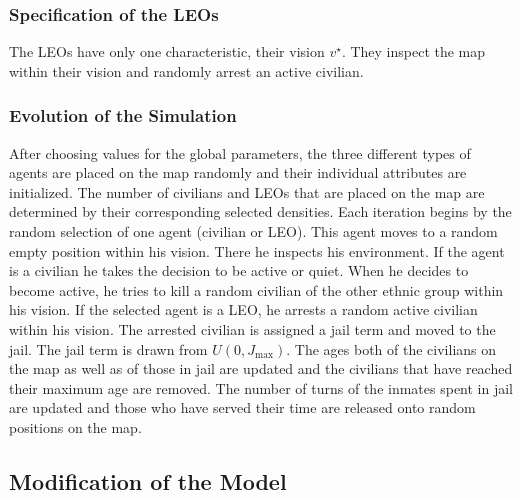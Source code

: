 \documentclass[11pt]{article}
\begin{document}
\subsubsection{Specification of the LEOs}
The LEOs have only one characteristic, their vision $v^\star$. They inspect the map within their vision and randomly arrest an active civilian.

\subsubsection{Evolution of the Simulation}
After choosing values for the global parameters, the three different types of agents are placed on the map randomly and their individual attributes are initialized. The number of civilians and LEOs that are placed on the map are determined by their corresponding selected densities. Each iteration begins by the random selection of one agent (civilian or LEO). This agent moves to a random empty position within his vision. There he inspects his environment. If the agent is a civilian he takes the decision to be active or quiet. When he decides to become active, he tries to kill a random civilian of the other ethnic group within his vision. If the selected agent is a LEO, he arrests a random active civilian within his vision. The arrested civilian is assigned a jail term and moved to the jail. The jail term is drawn from $U(0,J_{\text{max}})$. The ages both of the civilians on the map as well as of those in jail are updated and the civilians that have reached their maximum age are removed. The number of turns of the inmates spent in jail are updated and those who have served their time are released onto random positions on the map.

\subsection{Modification of the Model}
\end{document}
